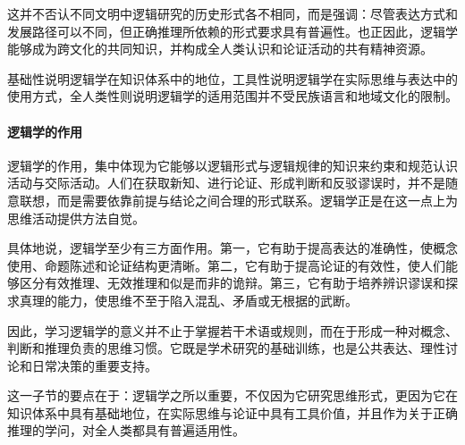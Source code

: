 这并不否认不同文明中逻辑研究的历史形式各不相同，而是强调：尽管表达方式和发展路径可以不同，但正确推理所依赖的形式要求具有普遍性。也正因此，逻辑学能够成为跨文化的共同知识，并构成全人类认识和论证活动的共有精神资源。

\begin{note}
基础性说明逻辑学在知识体系中的地位，工具性说明逻辑学在实际思维与表达中的使用方式，全人类性则说明逻辑学的适用范围并不受民族语言和地域文化的限制。
\end{note}

\paragraph{逻辑学的作用}\label{logic.function_of_logic}

逻辑学的作用，集中体现为它能够以逻辑形式与逻辑规律的知识来约束和规范认识活动与交际活动。人们在获取新知、进行论证、形成判断和反驳谬误时，并不是随意联想，而是需要依靠前提与结论之间合理的形式联系。逻辑学正是在这一点上为思维活动提供方法自觉。

具体地说，逻辑学至少有三方面作用。第一，它有助于提高表达的准确性，使概念使用、命题陈述和论证结构更清晰。第二，它有助于提高论证的有效性，使人们能够区分有效推理、无效推理和似是而非的诡辩。第三，它有助于培养辨识谬误和探求真理的能力，使思维不至于陷入混乱、矛盾或无根据的武断。

因此，学习逻辑学的意义并不止于掌握若干术语或规则，而在于形成一种对概念、判断和推理负责的思维习惯。它既是学术研究的基础训练，也是公共表达、理性讨论和日常决策的重要支持。

\begin{important}
这一子节的要点在于：逻辑学之所以重要，不仅因为它研究思维形式，更因为它在知识体系中具有基础地位，在实际思维与论证中具有工具价值，并且作为关于正确推理的学问，对全人类都具有普遍适用性。
\end{important}
